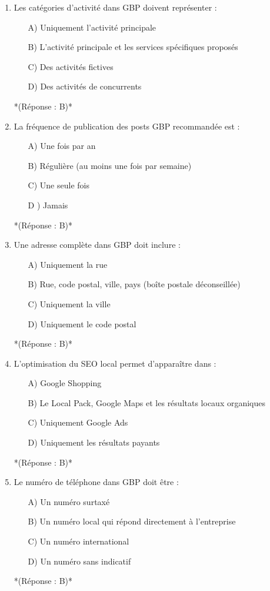 \documentclass[12pt,a4paper,twoside]{report}
\begin{document}
\begin{enumerate}
\item Les catégories d'activité dans GBP doivent représenter :
\begin{itemize}
\item[A)] Uniquement l'activité principale
\item[B)] L'activité principale et les services spécifiques proposés
\item[C)] Des activités fictives
\item[D)] Des activités de concurrents
\end{itemize}
*(Réponse : B)*

\item La fréquence de publication des posts GBP recommandée est :
\begin{itemize}
\item[A)] Une fois par an
\item[B)] Régulière (au moins une fois par semaine)
\item[C)] Une seule fois
\item[D]) Jamais
\end{itemize}
*(Réponse : B)*

\item Une adresse complète dans GBP doit inclure :
\begin{itemize}
\item[A)] Uniquement la rue
\item[B)] Rue, code postal, ville, pays (boîte postale déconseillée)
\item[C)] Uniquement la ville
\item[D)] Uniquement le code postal
\end{itemize}
*(Réponse : B)*

\item L'optimisation du SEO local permet d'apparaître dans :
\begin{itemize}
\item[A)] Google Shopping
\item[B)] Le Local Pack, Google Maps et les résultats locaux organiques
\item[C)] Uniquement Google Ads
\item[D)] Uniquement les résultats payants
\end{itemize}
*(Réponse : B)*

\item Le numéro de téléphone dans GBP doit être :
\begin{itemize}
\item[A)] Un numéro surtaxé
\item[B)] Un numéro local qui répond directement à l'entreprise
\item[C)] Un numéro international
\item[D)] Un numéro sans indicatif
\end{itemize}
*(Réponse : B)*
\end{enumerate}
\end{document}
